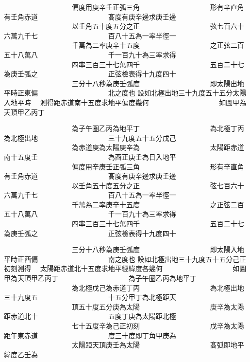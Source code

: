 \begin{正文}
　　　　　　　　　　偏度用庚辛壬正弧三角
　　　　　　　　　　形有辛直角有壬角赤道
　　　　　　　　　　髙度有庚辛邊求庚壬邊
　　　　　　　　　　以壬角五十度五分之正
　　　　　　　　　　弦七百六十六萬九千七
　　　　　　　　　　百八十五為一率半徑一
　　　　　　　　　　千萬為二率庚辛十五度
　　　　　　　　　　之正弦二百五十八萬八
　　　　　　　　　　千一百九十為三率求得
　　　　　　　　　　四率三百三十七萬四千
　　　　　　　　　　五百二十七為庚壬弧之
　　　　　　　　　　正弦檢表得十九度四十
　　　　　　　　　　三分十八秒為庚壬弧度
　　　　　　　　　　即太陽出地平時正東偏
　　　　　　　　　　北之度也
設如北極出地三十九度五十五分太陽入地平時
　測得距赤道南十五度求地平偏度㡬何
　　　　　　　　　　如圖甲為天頂甲乙丙丁
\par
\end{正文}\clearpage
{}
\begin{正文}
　　　　　　　　　　為子午圏乙丙為地平丁
　　　　　　　　　　為北極丁丙為北極出地
　　　　　　　　　　三十九度五十五分戊己
　　　　　　　　　　為赤道庚為太陽庚辛為
　　　　　　　　　　太陽距赤道南十五度壬
　　　　　　　　　　為酉正庚壬為日入地平
　　　　　　　　　　偏度用辛庚壬正弧三角
　　　　　　　　　　形有辛直角有壬角赤道
　　　　　　　　　　髙度有庚辛邊求庚壬邊
　　　　　　　　　　以壬角五十度五分之正
　　　　　　　　　　弦七百六十六萬九千七
　　　　　　　　　　百八十五為一率半徑一
　　　　　　　　　　千萬為二率庚辛十五度
　　　　　　　　　　之正弦二百五十八萬八
　　　　　　　　　　千一百九十為三率求得
　　　　　　　　　　四率三百三十七萬四千
　　　　　　　　　　五百二十七為庚壬弧之
　　　　　　　　　　正弦檢表得十九度四十
\par
\end{正文}\clearpage
{}
\begin{正文}
　　　　　　　　　　三分十八秒為庚壬弧度
　　　　　　　　　　即太陽入地平時正西偏
　　　　　　　　　　南之度也
設如北極出地三十九度五十五分己正初刻測得
　太陽距赤道北十五度求地平經緯度各㡬何
　　　　　　　　　　如圖甲為天頂甲乙丙丁
　　　　　　　　　　為子午圏乙丙為地平丁
　　　　　　　　　　為北極戊己為赤道丁丙
　　　　　　　　　　為北極出地三十九度五
　　　　　　　　　　十五分甲丁為北極距天
　　　　　　　　　　頂五十度五分庚為太陽
　　　　　　　　　　庚辛為太陽距赤道北十
　　　　　　　　　　五度丁庚為太陽距北極
　　　　　　　　　　七十五度辛為己正初刻
　　　　　　　　　　戊辛為太陽距午東赤道
　　　　　　　　　　度三十度即丁角甲庚為
　　　　　　　　　　太陽距天頂庚壬為太陽
　　　　　　　　　　髙弧即地平緯度乙壬為
\par
\end{正文}\clearpage
